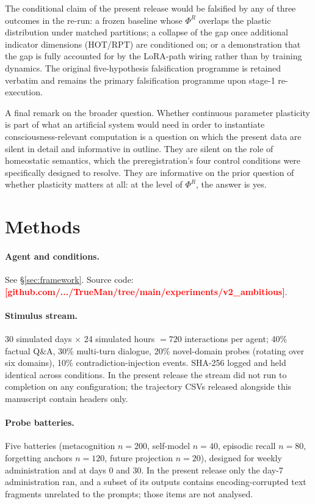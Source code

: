 \documentclass[pdflatex,sn-mathphys-num]{sn-jnl}
\newcommand{\PLACE}[1]{\textcolor{red}{\textbf{[#1]}}}
\theoremstyle{thmstyleone}
\theoremstyle{thmstylethree}
\begin{document}
The conditional claim of the present release would be falsified by any of three outcomes in the re-run: a frozen baseline whose $\Phi^R$ overlaps the plastic distribution under matched partitions; a collapse of the gap once additional indicator dimensions (HOT/RPT) are conditioned on; or a demonstration that the gap is fully accounted for by the LoRA-path wiring rather than by training dynamics. The original five-hypothesis falsification programme is retained verbatim and remains the primary falsification programme upon stage-1 re-execution.

A final remark on the broader question. Whether continuous parameter plasticity is part of what an artificial system would need in order to instantiate consciousness-relevant computation is a question on which the present data are silent in detail and informative in outline. They are silent on the role of homeostatic semantics, which the preregistration's four control conditions were specifically designed to resolve. They are informative on the prior question of whether plasticity matters at all: at the level of $\Phi^R$, the answer is yes.

\section{Methods}\label{sec:methods}

\paragraph{Agent and conditions.} See \S\ref{sec:framework}. Source code: \PLACE{github.com/.../TrueMan/tree/main/experiments/v2\_ambitious}.

\paragraph{Stimulus stream.} 30 simulated days $\times$ 24 simulated hours $= 720$ interactions per agent; 40\% factual Q\&A, 30\% multi-turn dialogue, 20\% novel-domain probes (rotating over six domains), 10\% contradiction-injection events. SHA-256 logged and held identical across conditions. In the present release the stream did not run to completion on any configuration; the trajectory CSVs released alongside this manuscript contain headers only.

\paragraph{Probe batteries.} Five batteries (metacognition $n=200$, self-model $n=40$, episodic recall $n=80$, forgetting anchors $n=120$, future projection $n=20$), designed for weekly administration and at days 0 and 30. In the present release only the day-7 administration ran, and a subset of its outputs contains encoding-corrupted text fragments unrelated to the prompts; those items are not analysed.
\end{document}
